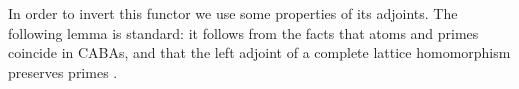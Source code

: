 \documentclass[10pt,a4paper]{article}
\newtheorem{lemma}[theorem]{Lemma}
\newtheorem{definition}[theorem]{Definition}
\begin{document}
In order to invert this functor we use some properties of its adjoints. The
following lemma is standard: it follows from the facts that atoms and primes
coincide in CABAs, and that the left adjoint of a complete lattice
homomorphism preserves primes \cite[Lemma 1.23 and Exercise 1.3.10.e]{gehrke_2024}.



\end{document}
